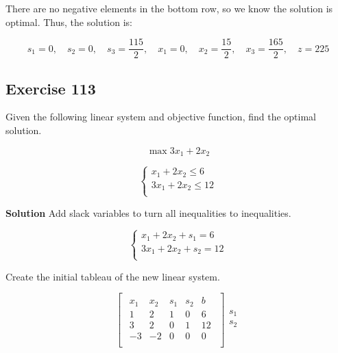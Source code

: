 \documentclass{article}
\begin{document}
\begin{flushleft}
There are no negative elements in the bottom row, so we know the solution is optimal. Thus, the solution is:
\end{flushleft}

\begin{equation*}
s_1 = 0, \quad s_2 = 0, \quad s_3 = \frac{115}{2}, \quad x_1 = 0, \quad x_2 = \frac{15}{2}, \quad x_3 = \frac{165}{2}, \quad z = 225
\end{equation*}

\subsection*{Exercise 113}
Given the following linear system and objective function, find the optimal solution.

\begin{equation*}
\max{ 3x_1 + 2x_2 }
\end{equation*}

\[
\begin{cases}
x_1 + 2x_2 \leq 6 \\
3x_1 + 2x_2 \leq 12 \\
\end{cases}
\]

\textbf{Solution}
Add slack variables to turn all inequalities to inequalities.

\[
\begin{cases}
x_1 + 2x_2 + s_1 = 6 \\
3x_1 + 2x_2 + s_2 = 12 \\
\end{cases}
\]

Create the initial tableau of the new linear system.

\begin{equation*}
\begin{bmatrix}
\begin{array}{cccc|c}
x_1 & x_2 & s_1 & s_2 & b \\
\hline
1 & 2 & 1 & 0 & 6 \\
3 & 2 & 0 & 1 & 12 \\
\hline
-3 & -2 & 0 & 0 & 0 \\
\end{array}
\end{bmatrix}
\begin{array}{c}
\\
s_1 \\
s_2 \\
\\
\end{array}
\end{equation*}
\end{document}

